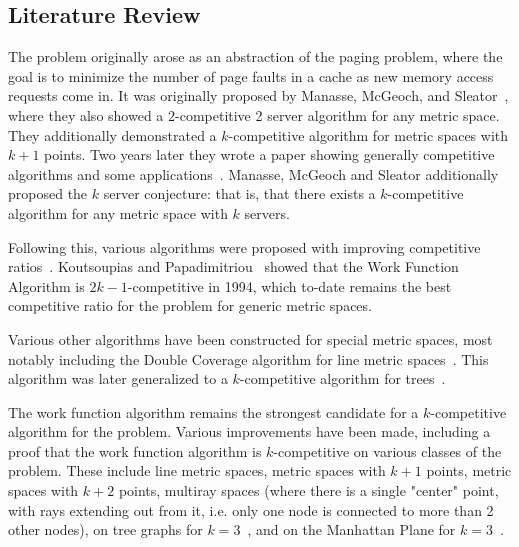 \subsection{Literature Review}

The \KS problem originally arose as an abstraction of the paging problem, where the goal is to minimize the number of page faults in a cache as new memory access requests come in. It was originally proposed by Manasse, McGeoch, and Sleator~\cite{KS1988}, where they also showed a $2$-competitive 2 server algorithm for any metric space. They additionally demonstrated a $k$-competitive algorithm for metric spaces with $k+1$ points. Two years later they wrote a paper showing generally competitive algorithms and some applications~\cite{KS1990}. Manasse, McGeoch and Sleator additionally proposed the $k$ server conjecture: that is, that there exists a $k$-competitive algorithm for any metric space with $k$ servers. 

Following this, various algorithms were proposed with improving competitive ratios~\cite{KS1990, harm2000}. Koutsoupias and Papadimitriou~\cite{KS1990} showed that the Work Function Algorithm is $2k-1$-competitive in 1994, which to-date remains the best competitive ratio for the \KS problem for generic metric spaces.

Various other algorithms have been constructed for special metric spaces, most notably including the Double Coverage algorithm for line metric spaces~\cite{new1991}. This algorithm was later generalized to a $k$-competitive algorithm for trees~\cite{tree1991}.

The work function algorithm remains the strongest candidate for a $k$-competitive algorithm for the \KS problem. Various improvements have been made, including a proof that the work function algorithm is $k$-competitive on various classes of the problem. These include line metric spaces, metric spaces with $k+1$ points, metric spaces with $k+2$ points, multiray spaces (where there is a single "center" point, with rays extending out from it, i.e. only one node is connected to more than 2 other nodes), on tree graphs for $k=3$~\cite{unifyingPotential2021}, and on the Manhattan Plane for $k=3$~\cite{MP2002}. 

